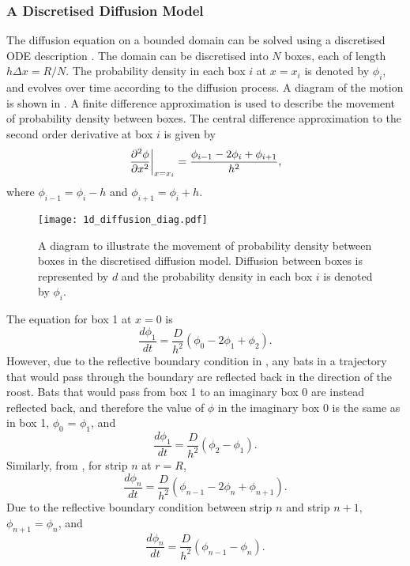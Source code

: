  \subsubsection{A Discretised Diffusion Model} \label{1ddiscrete}

 The diffusion equation on a bounded domain can be solved using a discretised ODE description \cite{woolley2011stochastic}. The domain can be discretised into $N$ boxes, each of length
 $h\Delta x=R/N$. The probability density in each box $i$ at $x=x_i$ is denoted by $\phi_i$, and evolves over time according to the diffusion process. A diagram of the motion is shown in . A finite difference approximation is used to describe the movement of probability density between boxes. The central difference approximation to the second order derivative at box $i$ is given by
 \begin{equation}
  \left.\frac{\partial^2 \phi}{\partial x^2}\right|_{x=x_i}= \frac{\phi_{i-1}-2\phi_i+\phi_{i+1}}{h^2}, \label{eqn:diffusion_discrete1di}
 \end{equation}
 where $\phi_{i-1} = \phi_i - h$ and $\phi_{i+1} = \phi_i + h$.

 \begin{figure} [t]
     \centering
         \texttt{[image: 1d\_diffusion\_diag.pdf]}
         \caption{A diagram to illustrate the movement of probability density between boxes in the discretised diffusion model. Diffusion between boxes is represented by $d$ and the probability density in each box $i$ is denoted by $\phi_i$.}
     \label{fig:diffusion_diagram1d}
 \end{figure}

 The equation for box 1 at $x = 0$ is
 \begin{equation}
 \frac{d\phi_1}{dt} = \frac{D}{h^2}(\phi_{0}-2\phi_1 +\phi_{2}).
 \end{equation}
 However, due to the reflective boundary condition in , any bats in a trajectory that would pass through the boundary are reflected back in the direction of the roost. Bats that would pass from box 1 to an imaginary box 0 are instead reflected back, and therefore the value of $\phi$ in the imaginary box 0 is the same as in box 1, $\phi_0$ = $\phi_1$, and
 \begin{equation}
 \frac{d\phi_1}{dt} = \frac{D}{h^2}(\phi_{2}- \phi_1).
         \label{eqn:box_1}
 \end{equation}
%
 Similarly, from , for strip $n$ at $r=R$,
 \begin{equation}
 \frac{d\phi_n}{dt} = \frac{D}{h^2}(\phi_{n-1}-2\phi_n +\phi_{n+1}).
 \end{equation}
 Due to the reflective boundary condition between strip $n$ and strip $n+1$, $\phi_{n+1} = \phi_n$, and
 \begin{equation}
 \frac{d\phi_n}{dt} = \frac{D}{h^2}(\phi_{n-1}-\phi_n).
         \label{eqn:strip_n1d}
 \end{equation}

